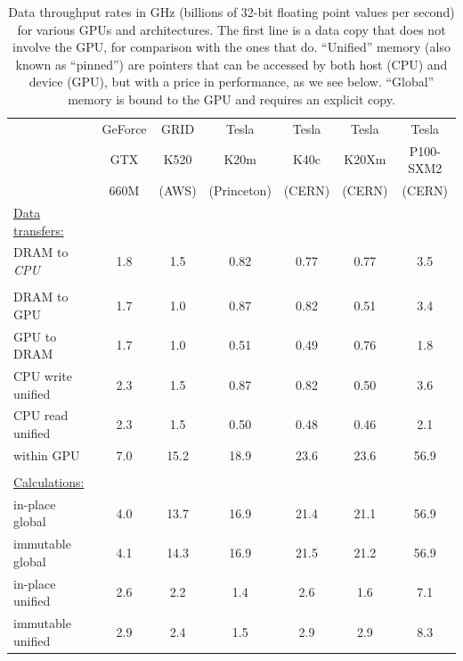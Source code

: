 \documentclass[12pt]{article}
\begin{document}
\begin{table}[t]
\caption{\label{gpu-results} Data throughput rates in GHz (billions of 32-bit floating point values per second) for various GPUs and architectures. The first line is a data copy that does not involve the GPU, for comparison with the ones that do. ``Unified'' memory (also known as ``pinned'') are pointers that can be accessed by both host (CPU) and device (GPU), but with a price in performance, as we see below. ``Global'' memory is bound to the GPU and requires an explicit copy.}

\begin{center}
\begin{tabular}{l c c c c c c}
                  &  GeForce & GRID     & Tesla       & Tesla  & Tesla  & Tesla     \\
                  &  GTX     & K520     & K20m        & K40c   & K20Xm  & P100-SXM2 \\
                  &  660M    & (AWS)    & (Princeton) & (CERN) & (CERN) & (CERN)    \\
\underline{Data transfers:}   &          &          &             &        &        &           \\
DRAM to {\it CPU} & 1.8      & 1.5      & 0.82        & 0.77   & 0.77   & 3.5       \\       
                  &          &          &             &        &        &           \\
DRAM to GPU       & 1.7      & 1.0      & 0.87        & 0.82   & 0.51   & 3.4       \\  
GPU to DRAM       & 1.7      & 1.0      & 0.51        & 0.49   & 0.76   & 1.8       \\ 
CPU write unified & 2.3      & 1.5      & 0.87        & 0.82   & 0.50   & 3.6       \\      
CPU read unified  & 2.3      & 1.5      & 0.50        & 0.48   & 0.46   & 2.1       \\     
within GPU        & 7.0      & 15.2     & 18.9        & 23.6   & 23.6   & 56.9      \\      
                  &          &          &             &        &        &           \\
\underline{Calculations:}     &          &          &             &        &        &           \\
in-place global   & 4.0      & 13.7     & 16.9        & 21.4   & 21.1   & 56.9      \\
immutable global  & 4.1      & 14.3     & 16.9        & 21.5   & 21.2   & 56.9      \\ 
in-place unified  & 2.6      & 2.2      & 1.4         & 2.6    & 1.6    & 7.1       \\
immutable unified & 2.9      & 2.4      & 1.5         & 2.9    & 2.9    & 8.3       \\
\end{tabular}
\end{center}
\end{table}
\end{document}

